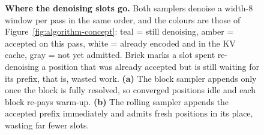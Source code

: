 \begin{figure}[t]
\caption{\textbf{Where the denoising slots go.} Both samplers denoise a
width-$8$ window per pass in the same order, and the colours are those of
Figure~\ref{fig:algorithm-concept}: teal = still denoising, amber = accepted
on this pass, white = already encoded and in the KV cache, gray = not yet
admitted.  Brick marks a slot spent re-denoising a position that was already
accepted but is still waiting for its prefix, that is, wasted work.
\textbf{(a)} The block sampler appends only once the block is fully resolved,
so converged positions idle and each block re-pays warm-up.  \textbf{(b)} The
rolling sampler appends the accepted prefix immediately and admits fresh
positions in its place, wasting far fewer slots.}
\label{fig:block-vs-rolling}
\end{figure}